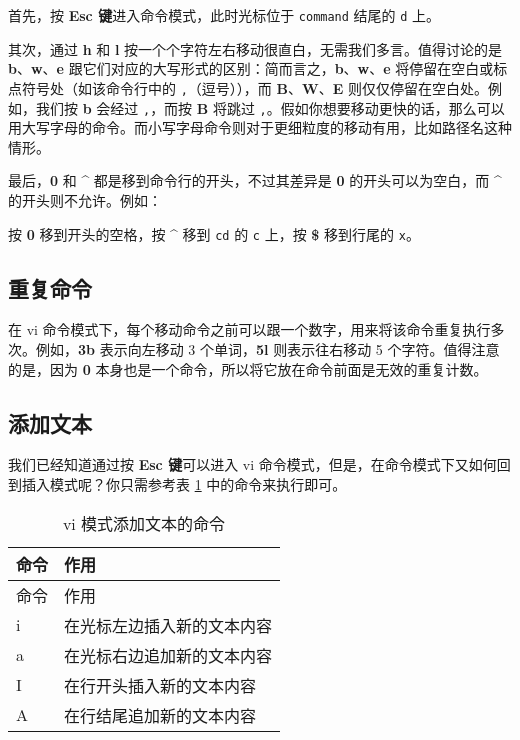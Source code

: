 \documentclass[]{ctexbook}
\newenvironment{Shaded}{\begin{snugshade}}{\end{snugshade}}
\newcommand{\ExtensionTok}[1]{#1}
\newcommand{\NormalTok}[1]{#1}
\begin{document}
首先，按 \textbf{Esc 键}进入命令模式，此时光标位于 \texttt{command} 结尾的 \texttt{d} 上。

其次，通过 \textbf{h} 和 \textbf{l} 按一个个字符左右移动很直白，无需我们多言。值得讨论的是 \textbf{b}、\textbf{w}、\textbf{e} 跟它们对应的大写形式的区别：简而言之，\textbf{b}、\textbf{w}、\textbf{e} 将停留在空白或标点符号处（如该命令行中的 \texttt{,}（逗号）），而 \textbf{B}、\textbf{W}、\textbf{E} 则仅仅停留在空白处。例如，我们按 \textbf{b} 会经过 \texttt{,}，而按 \textbf{B} 将跳过 \texttt{,}。假如你想要移动更快的话，那么可以用大写字母的命令。而小写字母命令则对于更细粒度的移动有用，比如路径名这种情形。

最后，\textbf{0} 和 \textbf{\^{}} 都是移到命令行的开头，不过其差异是 \textbf{0} 的开头可以为空白，而 \textbf{\^{}} 的开头则不允许。例如：

\begin{Shaded}
\end{Shaded}

按 \textbf{0} 移到开头的空格，按 \textbf{\^{}} 移到 \texttt{cd} 的 \texttt{c} 上，按 \textbf{\$} 移到行尾的 \texttt{x}。

\hypertarget{ux91cdux590dux547dux4ee4}{%
\subsection{重复命令}\label{ux91cdux590dux547dux4ee4}}

在 vi 命令模式下，每个移动命令之前可以跟一个数字，用来将该命令重复执行多次。例如，\textbf{3b} 表示向左移动 3 个单词，\textbf{5l} 则表示往右移动 5 个字符。值得注意的是，因为 \textbf{0} 本身也是一个命令，所以将它放在命令前面是无效的重复计数。

\hypertarget{ux6dfbux52a0ux6587ux672c}{%
\subsection{添加文本}\label{ux6dfbux52a0ux6587ux672c}}

我们已经知道通过按 \textbf{Esc 键}可以进入 vi 命令模式，但是，在命令模式下又如何回到插入模式呢？你只需参考表 \ref{tab:vi-add} 中的命令来执行即可。

\begin{longtable}[]{@{}ll@{}}
\caption{\label{tab:vi-add} vi 模式添加文本的命令}\tabularnewline
\toprule
命令 & 作用\tabularnewline
\midrule
\endfirsthead
\toprule
命令 & 作用\tabularnewline
\midrule
\endhead
i & 在光标左边插入新的文本内容\tabularnewline
a & 在光标右边追加新的文本内容\tabularnewline
I & 在行开头插入新的文本内容\tabularnewline
A & 在行结尾追加新的文本内容\tabularnewline
\bottomrule
\end{longtable}
\end{document}
